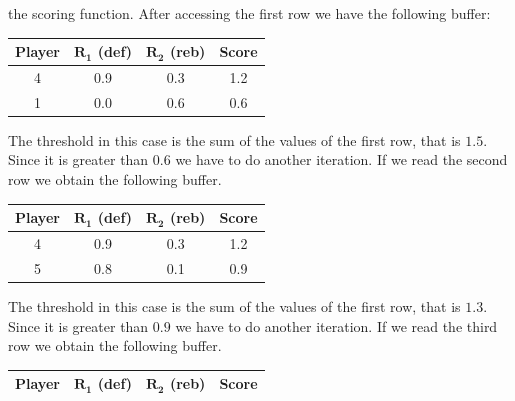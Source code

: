 \documentclass[12pt, a4paper]{report}
\newtheorem[style=M,bodystyle=\normalfont]{theorem}{Theorem}
\newtheorem[style=M,bodystyle=\normalfont]{corollary}{Corollary}
\newtheorem[style=M,bodystyle=\normalfont]{lemma}{Lemma}
\newtheorem[style=M,bodystyle=\normalfont]{definition}{Definition}
\begin{document}
\begin{enumerate}
            the scoring function. After accessing the first row we have the following buffer: 
            \begin{table}[H]
                \centering
                \begin{tabular}{c|cc|c}
                \hline
                \textbf{Player} & \textbf{$\boldsymbol{R_1}$ (def)} & \textbf{$\boldsymbol{R_2}$ (reb)} & \textbf{Score} \\ \hline
                4               & 0.9                               & 0.3                               & 1.2            \\
                1               & 0.0                               & 0.6                               & 0.6            \\ \hline
                \end{tabular}
            \end{table}
            The threshold in this case is the sum of the values of the first row, that is $1.5$. Since it is greater than $0.6$ we have to do
            another iteration. If we read the second row we obtain the following buffer. 
            \begin{table}[H]
                \centering
                \begin{tabular}{c|cc|c}
                \hline
                \textbf{Player} & \textbf{$\boldsymbol{R_1}$ (def)} & \textbf{$\boldsymbol{R_2}$ (reb)} & \textbf{Score} \\ \hline
                4               & 0.9                               & 0.3                               & 1.2            \\
                5               & 0.8                               & 0.1                               & 0.9            \\ \hline
                \end{tabular}
            \end{table}
            The threshold in this case is the sum of the values of the first row, that is $1.3$. Since it is greater than $0.9$ we have to do
            another iteration. If we read the third row we obtain the following buffer. 
            \begin{table}[H]
                \centering
                \begin{tabular}{c|cc|c}
                \hline
                \textbf{Player} & \textbf{$\boldsymbol{R_1}$ (def)} & \textbf{$\boldsymbol{R_2}$ (reb)} & \textbf{Score} \\ \hline

\end{tabular}
\end{table}
\end{enumerate}
\end{document}
